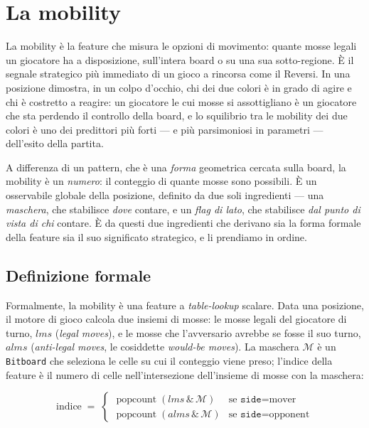 \section{La mobility}

La mobility è la feature che misura le opzioni di movimento: quante mosse legali un
giocatore ha a disposizione, sull'intera board o su una sua sotto-regione. È il
segnale strategico più immediato di un gioco a rincorsa come il Reversi. In una
posizione dimostra, in un colpo d'occhio, chi dei due colori è in grado di agire e chi
è costretto a reagire: un giocatore le cui mosse si assottigliano è un giocatore che
sta perdendo il controllo della board, e lo squilibrio tra le mobility dei due colori
è uno dei predittori più forti --- e più parsimoniosi in parametri --- dell'esito
della partita.

A differenza di un pattern, che è una \textit{forma} geometrica cercata sulla board,
la mobility è un \textit{numero}: il conteggio di quante mosse sono possibili. È un
osservabile globale della posizione, definito da due soli ingredienti --- una
\textit{maschera}, che stabilisce \textit{dove} contare, e un \textit{flag di
lato}, che stabilisce \textit{dal punto di vista di chi} contare. È da questi due
ingredienti che derivano sia la forma formale della feature sia il suo significato
strategico, e li prendiamo in ordine.

\subsection{Definizione formale}

Formalmente, la mobility è una feature a \textit{table-lookup} scalare. Data una
posizione, il motore di gioco calcola due insiemi di mosse: le mosse legali del
giocatore di turno, $lms$ (\textit{legal moves}), e le mosse che l'avversario avrebbe
se fosse il suo turno, $alms$ (\textit{anti-legal moves}, le cosiddette
\textit{would-be moves}). La maschera $\mathcal{M}$ è un \texttt{Bitboard} che
seleziona le celle su cui il conteggio viene preso; l'indice della feature è il
numero di celle nell'intersezione dell'insieme di mosse con la maschera:

\begin{equation}
\text{indice} \;=\;
\begin{cases}
\operatorname{popcount}\!\left(lms \,\&\, \mathcal{M}\right) & \text{se } \texttt{side} = \text{mover} \\[4pt]
\operatorname{popcount}\!\left(alms \,\&\, \mathcal{M}\right) & \text{se } \texttt{side} = \text{opponent}
\end{cases}
\end{equation}

